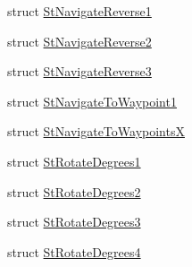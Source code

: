 \begin{DoxyCompactItemize}
\item 
struct \hyperlink{structsm__dance__bot__strikes__back_1_1StNavigateReverse1}{St\+Navigate\+Reverse1}
\item 
struct \hyperlink{structsm__dance__bot__strikes__back_1_1StNavigateReverse2}{St\+Navigate\+Reverse2}
\item 
struct \hyperlink{structsm__dance__bot__strikes__back_1_1StNavigateReverse3}{St\+Navigate\+Reverse3}
\item 
struct \hyperlink{structsm__dance__bot__strikes__back_1_1StNavigateToWaypoint1}{St\+Navigate\+To\+Waypoint1}
\item 
struct \hyperlink{structsm__dance__bot__strikes__back_1_1StNavigateToWaypointsX}{St\+Navigate\+To\+WaypointsX}
\item 
struct \hyperlink{structsm__dance__bot__strikes__back_1_1StRotateDegrees1}{St\+Rotate\+Degrees1}
\item 
struct \hyperlink{structsm__dance__bot__strikes__back_1_1StRotateDegrees2}{St\+Rotate\+Degrees2}
\item 
struct \hyperlink{structsm__dance__bot__strikes__back_1_1StRotateDegrees3}{St\+Rotate\+Degrees3}
\item 
struct \hyperlink{structsm__dance__bot__strikes__back_1_1StRotateDegrees4}{St\+Rotate\+Degrees4}
\end{DoxyCompactItemize}
